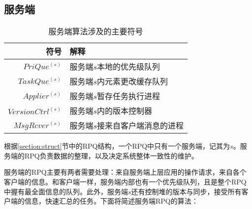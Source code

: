 	\subsection{服务端}
		\begin{table}
			\begin{center}
				\begin{tabular}{r|l}		
					\hline
					符号 & 解释 \\
					\hline\hline
					$PriQue^{(s)}$ & 服务端$s$本地的优先级队列\\
					$TaskQue^{(s)}$ & 服务端$s$内元素更改缓存队列\\
					$Applier^{(s)}$ & 服务端$s$暂存任务执行进程\\
					$VersionCtrl^{(s)}$ & 服务端$s$内的版本控制器\\
					$MsgRcver^{(s)}$ & 服务端$s$接来自客户端消息的进程\\
					\hline
				\end{tabular}
				\caption{服务端算法涉及的主要符号}
				\label{table:server symble}
			\end{center}
		\end{table}
		\par 根据\ref{section:struct}节中的RPQ结构，一个RPQ中只有一个服务端，记其为$s$。服务端的RPQ负责数据的整理，以及决定系统整体一致性的维护。
		\par 服务端的RPQ主要有两者需要处理：来自服务端上层应用的操作请求，来自各个客户端的信息。和客户端一样，服务端内部也有一个优先级队列，且是整个RPQ中握有最全面信息的队列。此外，服务端$s$还有控制堆的版本与同步，接受所有客户端的信息，快速汇总的任务。下面将简述服务端RPQ的算法：
